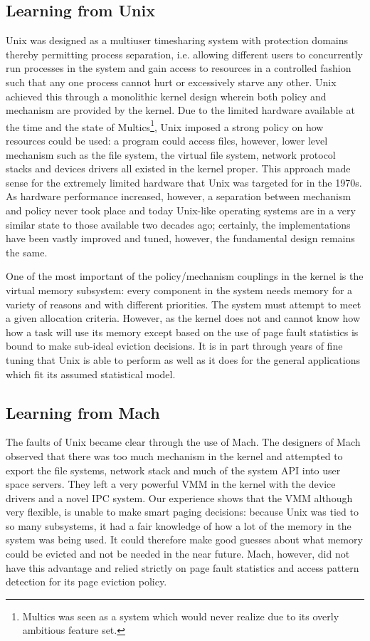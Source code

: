 \subsection{Learning from Unix}

Unix was designed as a multiuser timesharing system with protection
domains thereby permitting process separation, i.e. allowing different
users to concurrently run processes in the system and gain access to
resources in a controlled fashion such that any one process cannot
hurt or excessively starve any other.  Unix achieved this through a
monolithic kernel design wherein both policy and mechanism are
provided by the kernel.  Due to the limited hardware available at the
time and the state of Multics\footnote{Multics was seen as a system
which would never realize due to its overly ambitious feature set.},
Unix imposed a strong policy on how resources could be used: a program
could access files, however, lower level mechanism such as the file
system, the virtual file system, network protocol stacks and devices
drivers all existed in the kernel proper.  This approach made sense
for the extremely limited hardware that Unix was targeted for in the
1970s.  As hardware performance increased, however, a separation
between mechanism and policy never took place and today Unix-like
operating systems are in a very similar state to those available two
decades ago; certainly, the implementations have been vastly improved
and tuned, however, the fundamental design remains the same.

One of the most important of the policy/mechanism couplings in the
kernel is the virtual memory subsystem: every component in the system
needs memory for a variety of reasons and with different priorities.
The system must attempt to meet a given allocation criteria.  However,
as the kernel does not and cannot know how how a task will use its
memory except based on the use of page fault statistics is bound to
make sub-ideal eviction decisions.  It is in part through years of
fine tuning that Unix is able to perform as well as it does for the
general applications which fit its assumed statistical model.

\subsection{Learning from Mach}

The faults of Unix became clear through the use of Mach.  The
designers of Mach observed that there was too much mechanism in the
kernel and attempted to export the file systems, network stack and
much of the system API into user space servers.  They left a very
powerful VMM in the kernel with the device drivers and a novel IPC
system.  Our experience shows that the VMM although very flexible, is
unable to make smart paging decisions: because Unix was tied to so
many subsystems, it had a fair knowledge of how a lot of the memory in
the system was being used.  It could therefore make good guesses about
what memory could be evicted and not be needed in the near future.
Mach, however, did not have this advantage and relied strictly on page
fault statistics and access pattern detection for its page eviction
policy.

